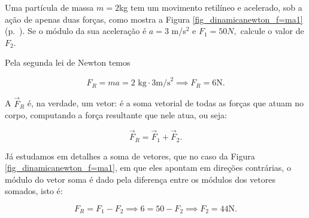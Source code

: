 \vspace{0.3cm}

\begin{exemplo}[Nível I]\label{exemplo_dinamica1_eq_dinamica1_segundaleinewtonex01}

Uma partícula de massa $m=2$kg tem um movimento retilíneo e acelerado, sob a ação de apenas duas forças, como mostra a Figura \ref{fig_dinamicanewton_f=ma1} (p.~\pageref{fig_dinamicanewton_f=ma1}). Se o módulo da sua aceleração é $a=3$ m/s$^2$ e $F_1 = 50N,$ calcule o valor de $F_2.$



\resolucao

Pela segunda lei de Newton temos

$$ F_R = ma = 2 \text{ kg} \cdot 3 \text{m/s}^2 \implies \boxed{ F_R = 6 \text{N}.}$$

A $\vec F_R$ é, na verdade, um vetor: é a soma vetorial de todas as forças que atuam no corpo, computando a força resultante que nele atua, ou seja:

$$ \vec F_R = \vec F_1 + \vec F_2.$$

Já estudamos em detalhes a soma de vetores, que no caso da Figura \ref{fig_dinamicanewton_f=ma1}, em que eles apontam em direções contrárias, o módulo do vetor soma é dado pela diferença entre os módulos dos vetores somados, isto é:

$$ F_R = F_1 - F_2 \implies 6 = 50 - F_2 \implies \boxed{F_2 = 44 \text{N.}} $$



\end{exemplo}

\vspace{0.3cm}




